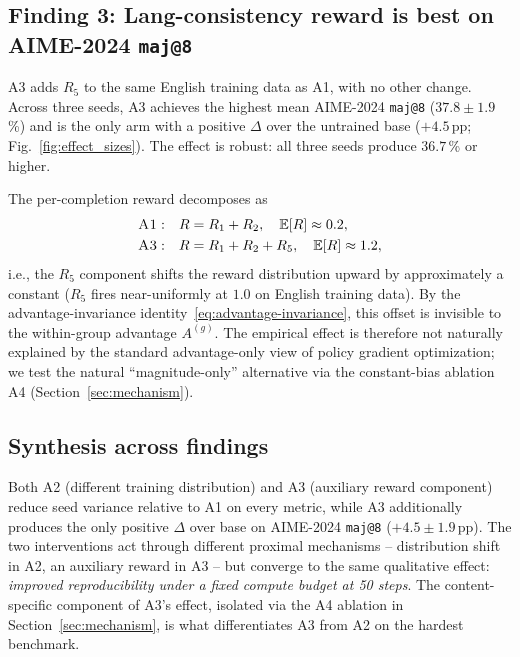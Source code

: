 \documentclass[journal,onecolumn,11pt]{IEEEtran}
\newcommand{\armA}{\textsc{A1}}
\newcommand{\armB}{\textsc{A2}}
\newcommand{\armC}{\textsc{A3}}
\newcommand{\armD}{\textsc{A4}}
\newcommand{\R}[1]{R_{#1}}
\newcommand{\E}{\mathbb{E}}
\begin{document}
\subsection{Finding 3: Lang-consistency reward is best on AIME-2024
\texttt{maj@8}}
\label{sec:finding3}
\armC{} adds $\R{5}$ to the same English training data as \armA{}, with
no other change. Across three seeds, \armC{} achieves the highest mean
AIME-2024 \texttt{maj@8} ($37.8 \pm 1.9$\,\%) and is the only arm with a
positive $\Delta$ over the untrained base ($+4.5$\,pp;
Fig.~\ref{fig:effect_sizes}). The effect is robust: all three seeds
produce $36.7$\,\% or higher.

The per-completion reward decomposes as
\begin{align*}
\armA{}: \quad & R = \R{1} + \R{2}, \quad \E[R]\approx 0.2, \\
\armC{}: \quad & R = \R{1} + \R{2} + \R{5}, \quad \E[R]\approx 1.2,
\end{align*}
i.e., the $\R{5}$ component shifts the reward distribution upward by
approximately a constant ($\R{5}$ fires near-uniformly at $1.0$ on
English training data). By the advantage-invariance
identity~\eqref{eq:advantage-invariance}, this offset is invisible to the
within-group advantage $A^{(g)}$. The empirical effect is therefore not
naturally explained by the standard advantage-only view of policy
gradient optimization; we test the natural ``magnitude-only'' alternative
via the constant-bias ablation \armD{} (Section~\ref{sec:mechanism}).

\subsection{Synthesis across findings}
\label{sec:synthesis}
Both \armB{} (different training distribution) and \armC{} (auxiliary
reward component) reduce seed variance relative to \armA{} on every
metric, while \armC{} additionally produces the only positive
$\Delta$ over base on AIME-2024 \texttt{maj@8} ($+4.5 \pm 1.9$\,pp).
The two interventions act through different proximal mechanisms --
distribution shift in \armB{}, an auxiliary reward in \armC{} -- but
converge to the same qualitative effect: \emph{improved
reproducibility under a fixed compute budget at 50 steps}. The
content-specific component of \armC{}'s effect, isolated via the
\armD{} ablation in Section~\ref{sec:mechanism}, is what differentiates
\armC{} from \armB{} on the hardest benchmark.

\end{document}
